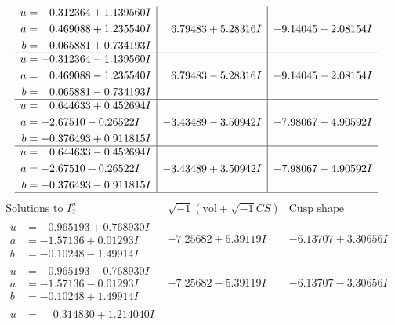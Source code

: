 \documentclass[1p]{elsarticle_modified}
\theoremstyle{definition}
\newcommand{\I}{\sqrt{-1}}
\begin{document}
$$\begin{array}{c|c|c}
\begin{aligned}
u &= -0.312364 + 1.139560 I \\
a &= \phantom{-}0.469088 + 1.235540 I \\
b &= \phantom{-}0.065881 + 0.734193 I\end{aligned}
 & \phantom{-}6.79483 + 5.28316 I & -9.14045 - 2.08154 I \\ \hline\begin{aligned}
u &= -0.312364 - 1.139560 I \\
a &= \phantom{-}0.469088 - 1.235540 I \\
b &= \phantom{-}0.065881 - 0.734193 I\end{aligned}
 & \phantom{-}6.79483 - 5.28316 I & -9.14045 + 2.08154 I \\ \hline\begin{aligned}
u &= \phantom{-}0.644633 + 0.452694 I \\
a &= -2.67510 - 0.26522 I \\
b &= -0.376493 + 0.911815 I\end{aligned}
 & -3.43489 - 3.50942 I & -7.98067 + 4.90592 I \\ \hline\begin{aligned}
u &= \phantom{-}0.644633 - 0.452694 I \\
a &= -2.67510 + 0.26522 I \\
b &= -0.376493 - 0.911815 I\end{aligned}
 & -3.43489 + 3.50942 I & -7.98067 - 4.90592 I\\
 \hline 
 \end{array}$$\newpage$$\begin{array}{c|c|c}  
\text{Solutions to }I^u_{2}& \I (\text{vol} + \sqrt{-1}CS) & \text{Cusp shape}\\
 \hline 
\begin{aligned}
u &= -0.965193 + 0.768930 I \\
a &= -1.57136 + 0.01293 I \\
b &= -0.10248 - 1.49914 I\end{aligned}
 & -7.25682 + 5.39119 I & -6.13707 + 3.30656 I \\ \hline\begin{aligned}
u &= -0.965193 - 0.768930 I \\
a &= -1.57136 - 0.01293 I \\
b &= -0.10248 + 1.49914 I\end{aligned}
 & -7.25682 - 5.39119 I & -6.13707 - 3.30656 I \\ \hline\begin{aligned}
u &= \phantom{-}0.314830 + 1.214040 I \\

\end{aligned}
\end{array}$$
\end{document}
